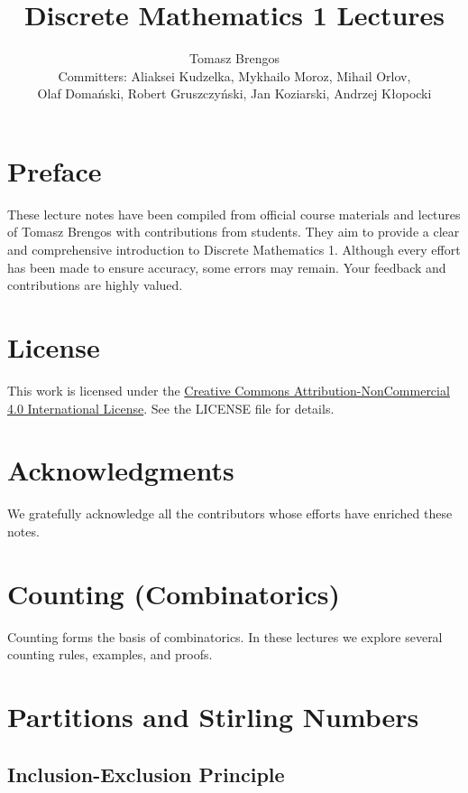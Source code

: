 \documentclass{article}
\title{Discrete Mathematics 1 Lectures}
\author{Tomasz Brengos \\  
Committers: Aliaksei Kudzelka, Mykhailo Moroz, Mihail Orlov, \\
Olaf Domański, Robert Gruszczyński, Jan Koziarski, Andrzej Kłopocki}
\date{}
\newcommand{\includelectureSub}[1]{%
  \begingroup
    \renewcommand{\section}{\subsection}%
  \endgroup
}
\newcommand{\includelectureNoHeader}[1]{%
  \begingroup
    \let\maketitle\relax%
  \endgroup
}
\begin{document}
\maketitle

\section*{Preface}
These lecture notes have been compiled from official course materials and lectures of Tomasz Brengos with contributions from students. They aim to provide a clear and comprehensive introduction to Discrete Mathematics 1. Although every effort has been made to ensure accuracy, some errors may remain. Your feedback and contributions are highly valued.

\section*{License}
This work is licensed under the \href{https://creativecommons.org/licenses/by-nc/4.0/}{Creative Commons Attribution-NonCommercial 4.0 International License}. See the LICENSE file for details.


\section*{Acknowledgments}
We gratefully acknowledge all the contributors whose efforts have enriched these notes.

\cleardoublepage

\tableofcontents
\clearpage

\section{Counting (Combinatorics)}
Counting forms the basis of combinatorics. In these lectures we explore several counting rules, examples, and proofs.
\includelectureSub{Counting}

\section{Partitions and Stirling Numbers}
\includelectureSub{Partitions_StirlingNumbers}

\section{Inclusion-Exclusion Principle}
\includelectureNoHeader{Inclusion_Exclusion}
\end{document}
